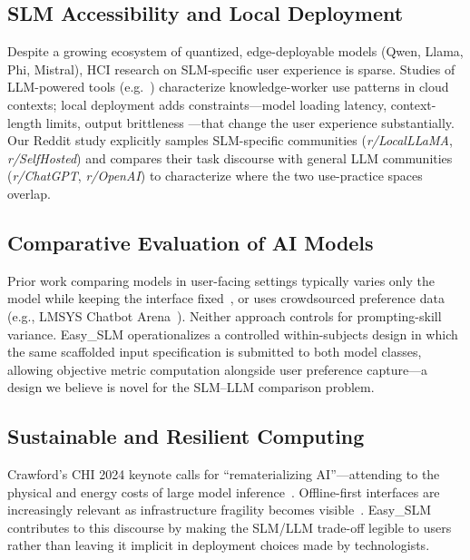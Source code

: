\subsection{SLM Accessibility and Local Deployment}

Despite a growing ecosystem of quantized, edge-deployable models (Qwen,
Llama, Phi, Mistral), HCI research on SLM-specific user experience is sparse.
Studies of LLM-powered tools (e.g.~\cite{brachman2024enterprise}) characterize
knowledge-worker use patterns in cloud contexts; local deployment adds
constraints---model loading latency, context-length limits, output brittleness
---that change the user experience substantially.
Our Reddit study explicitly samples SLM-specific communities (\textit{r/LocalLLaMA},
\textit{r/SelfHosted}) and compares their task discourse with general LLM
communities (\textit{r/ChatGPT}, \textit{r/OpenAI}) to characterize where the
two use-practice spaces overlap.

\subsection{Comparative Evaluation of AI Models}

Prior work comparing models in user-facing settings typically varies only the
model while keeping the interface fixed~\cite{lee2022coauthor}, or uses
crowdsourced preference data (e.g., LMSYS Chatbot Arena~\cite{chiang2024chatbot}).
Neither approach controls for prompting-skill variance.
Easy\_SLM operationalizes a controlled within-subjects design in which the same
scaffolded input specification is submitted to both model classes, allowing
objective metric computation alongside user preference capture---a design we
believe is novel for the SLM--LLM comparison problem.

\subsection{Sustainable and Resilient Computing}

Crawford's CHI 2024 keynote calls for ``rematerializing AI''---attending to the
physical and energy costs of large model
inference~\cite{crawford2024rematerializing}.
Offline-first interfaces are increasingly relevant as infrastructure fragility
becomes visible~\cite{tully2025crowdstrike}.
Easy\_SLM contributes to this discourse by making the SLM/LLM trade-off
legible to users rather than leaving it implicit in deployment choices made
by technologists.
